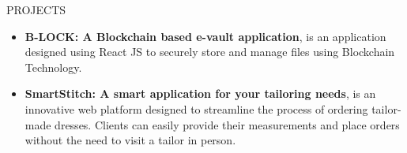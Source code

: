 \documentclass{resume} %
\begin{document}

\begin{rSection}{PROJECTS}
\begin{itemize}

    \item \textbf{B-LOCK: A Blockchain based e-vault application}{, is 
    an application designed using React JS to securely store and manage 
    files using Blockchain Technology. 
    }


\item \textbf{SmartStitch: A smart application for your tailoring needs}{, is an innovative web platform designed to streamline the process of ordering tailor-made dresses. 
Clients can easily provide their measurements and place orders without the need to visit a tailor in person.
}


\end{itemize}  

\end{rSection}
\end{document}
